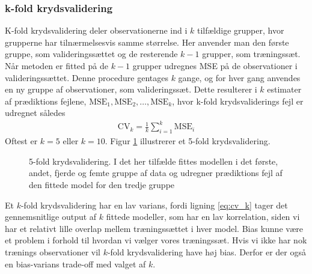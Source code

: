 \subsubsection{k-fold krydsvalidering}
K-fold krydsvalidering deler observationerne ind i $k$ tilfældige grupper, hvor grupperne har  tilnærmelsesvis samme størrelse. 
Her anvender man den første gruppe, som valideringssættet og de resterende $k-1$ grupper, som træningssæt. 
Når metoden er fitted på de $k-1$ grupper udregnes MSE på de observationer i valideringssættet. 
Denne procedure gentages $k$ gange, og for hver gang anvendes en ny gruppe af observationer, som valideringssæt. 
Dette resulterer i $k$ estimater af prædiktions fejlene, $\text{MSE}_1, \text{MSE}_2, \dots , \text{MSE}_k $, hvor k-fold krydsvaliderings fejl er udregnet således
\begin{align}
\text{CV}_k = \frac{1}{k} \sum_{i=1}^k \text{MSE}_i \label{eq:cv_k}
\end{align}
Oftest er $k=5$ eller $k = 10$. 
Figur \ref{fig:cv_teori} illustrerer et 5-fold krydsvalidering. 
%
\begin{figure}
\center
\scalebox{0.7}{}
\caption{5-fold krydsvalidering. I det her tilfælde fittes modellen i det første, andet, fjerde og femte gruppe af data og udregner prædiktions fejl af den fittede model for den tredje gruppe} \label{fig:cv_teori}
\end{figure} 
%
Et $k$-fold krydsvalidering har en lav varians, fordi ligning \eqref{eq:cv_k} tager det gennemsnitlige output af $k$ fittede modeller, som har en lav korrelation, siden vi har et relativt lille overlap mellem træningssættet i hver model. 
Bias kunne være et problem i forhold til hvordan vi vælger vores træningssæt. Hvis vi ikke har nok trænings observationer vil $k$-fold krydsvalidering have høj bias. Derfor er der også en bias-varians trade-off med valget af $k$. 

